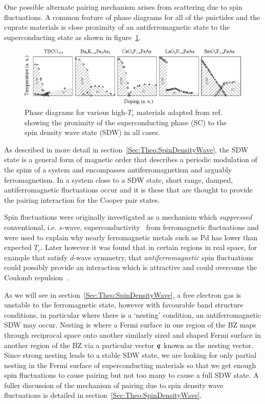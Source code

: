 One possible alternate pairing mechanism arises from scattering due to spin fluctuations. A common feature of phase diagrams for all of the pnictides and the cuprate materials is close proximity of an antiferromagnetic state to the superconducting state as shown in figure~\ref{Fig:Intro:PhaseDiagrams}.
\begin{figure}[htbp]
    \begin{center}
        \includegraphics[scale=1.0]{Chapter-Introduction/Figures/PhaseDiagrams/PhaseDiagrams}
        \caption{Phase diagrams for various high-$T_c$ materials adapted from ref.~\cite{Uemura2009} showing the proximity of the superconducting phase (SC) to the spin density wave state (SDW) in all cases.}
        \label{Fig:Intro:PhaseDiagrams}
    \end{center}
\end{figure}
As described in more detail in section~\ref{Sec:Theo:SpinDensityWave}, the \ac{SDW} state is a general form of magnetic order that describes a periodic modulation of the spins of a system and encompasses antiferromagnetism and arguably ferromagnetism. In a system close to a \ac{SDW} state, short range, damped, antiferromagnetic fluctuations occur and it is these that are thought to provide the pairing interaction for the Cooper pair states.

Spin fluctuations were originally investigated as a mechanism which \emph{suppressed} conventional, i.e. $s$-wave, superconductivity~\cite{Berk1966} from ferromagnetic fluctuations and were used to explain why nearly ferromagnetic metals such as Pd has lower than expected $T_c$. Later however it was found that in certain regions in real space, for example that satisfy $d$-wave symmetry, that \emph{antiferromagnetic} spin fluctuations could possibly provide an interaction which is attractive and could overcome the Coulomb repulsion~\cite{Scalapino1995}.

As we will see in section~\ref{Sec:Theo:SpinDensityWave}, a free electron gas is unstable to the ferromagnetic state, however with favourable band structure conditions, in particular where there is a `nesting' condition, an antiferromagnetic \ac{SDW} may occur. Nesting is where a Fermi surface in one region of the \ac{BZ} maps through reciprocal space onto another similarly sized and shaped Fermi surface in another region of the \ac{BZ} via a particular vector $\boldsymbol{q}$ known as the nesting vector. Since strong nesting leads to a stable \ac{SDW} state, we are looking for only partial nesting in the Fermi surface of superconducting materials so that we get enough spin fluctuations to cause pairing but not too many to cause a full \ac{SDW} state. A fuller discussion of the mechanism of pairing due to spin density wave fluctuations is detailed in section~\ref{Sec:Theo:SpinDensityWave}.

